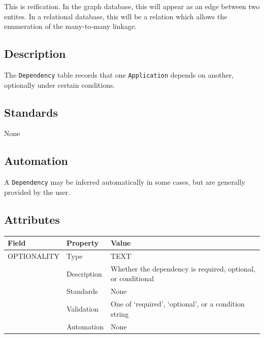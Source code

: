\documentclass[
]{article}
\newcounter{none} %
\begin{document}
This is reification. In the graph database, this will appear as an edge
between two entites. In a relational database, this will be a relation
which allows the enumeration of the many-to-many linkage.

\subsection{Description}\label{description-10}

The \texttt{Dependency} table records that one \texttt{Application}
depends on another, optionally under certain conditions.

\subsection{Standards}\label{standards-12}

None

\subsection{Automation}\label{automation-12}

A \texttt{Dependency} may be inferred automatically in some cases, but
are generally provided by the user.

\subsection{Attributes}\label{attributes-12}

{\def\LTcaptype{none} %
\begin{longtable}[]{@{}
  >{\raggedright\arraybackslash}p{}
  >{\raggedright\arraybackslash}p{}
  >{\raggedright\arraybackslash}p{}@{}}
\toprule\noalign{}
\begin{minipage}[b]{\linewidth}\raggedright
Field
\end{minipage} & \begin{minipage}[b]{\linewidth}\raggedright
Property
\end{minipage} & \begin{minipage}[b]{\linewidth}\raggedright
Value
\end{minipage} \\
\midrule\noalign{}
\endhead
\bottomrule\noalign{}
\endlastfoot
OPTIONALITY & Type & TEXT \\
& Description & Whether the dependency is required, optional, or
conditional \\
& Standards & None \\
& Validation & One of `required', `optional', or a condition string \\
& Automation & None \\
\end{longtable}
}
\end{document}
